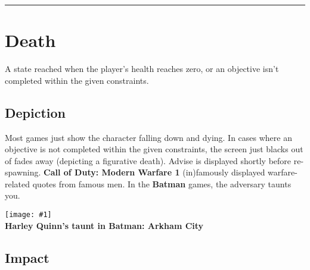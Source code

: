 \documentclass[12pt]{article}
\newcommand{\drawline}{\vspace{2mm}\hrule}
\newcommand{\fig}[3]{\begin{center} \texttt{[image: \#1]}\\ \textbf{#3} \end{center}}
\begin{document}
\drawline

\section{Death}

A state reached when the player's health reaches zero, or an objective isn't completed within the given constraints.

\subsection{Depiction}

Most games just show the character falling down and dying. In cases where an objective is not completed within the given constraints, the screen just blacks out of fades away (depicting a figurative death). Advise is displayed shortly before re-spawning. \textbf{Call of Duty: Modern Warfare 1} (in)famously displayed warfare-related quotes from famous men. In the \textbf{Batman} games, the adversary taunts you.

\fig{batman_taunt.jpg}{0.3}{Harley Quinn's taunt in Batman: Arkham City} 


\subsection{Impact}
\end{document}
